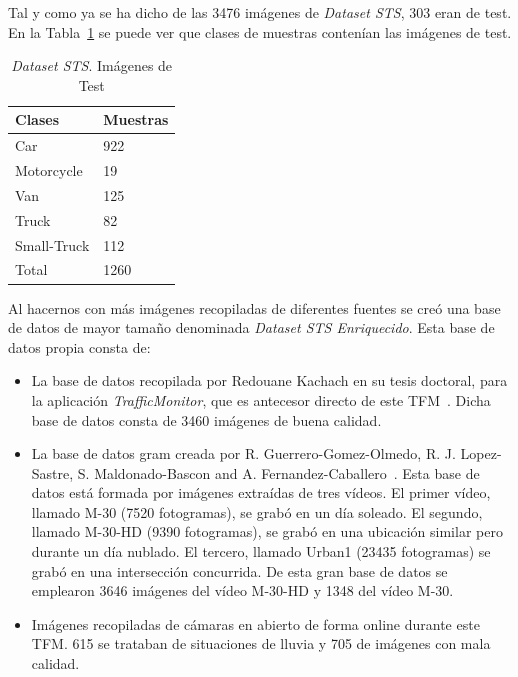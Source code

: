 Tal y como ya se ha dicho de las 3476 imágenes de \textit{Dataset STS}, 303 eran de test. En la Tabla~\ref{tabla_datos_primera_evaluacion} se puede ver que clases de muestras contenían las imágenes de test.

\begin{table}[H]
\begin{center}
\begin{tabular}{|l|l|}
\hline
Clases & Muestras \\
\hline \hline
Car & 922 \\ \hline
Motorcycle & 19 \\ \hline
Van & 125 \\ \hline
Truck & 82 \\ \hline
Small-Truck & 112 \\ \hline
Total & 1260 \\ \hline
\end{tabular}
\caption{\textit{Dataset STS}. Imágenes de Test}
\label{tabla_datos_primera_evaluacion}
\end{center}
\end{table}

Al hacernos con más imágenes recopiladas de diferentes fuentes se creó una base de datos de mayor tamaño denominada \textit{Dataset STS Enriquecido}. Esta base de datos propia consta de:
\begin{itemize}
    \item La base de datos recopilada por Redouane Kachach en su tesis doctoral, para la aplicación \textit{TrafficMonitor}, que es antecesor directo de este TFM~\cite{traffic_monitor_lab}. Dicha base de datos consta de 3460 imágenes de buena calidad.
    \item La base de datos \acrfull{gram} creada por R. Guerrero-Gomez-Olmedo, R. J. Lopez-Sastre, S. Maldonado-Bascon and A. Fernandez-Caballero~\cite{guerrero2013iwinac}. Esta base de datos está formada por imágenes extraídas de tres vídeos. El primer vídeo, llamado M-30 (7520 fotogramas), se grabó en un día soleado. El segundo, llamado M-30-HD (9390 fotogramas), se grabó en una ubicación similar pero durante un día nublado. El tercero, llamado Urban1 (23435 fotogramas) se grabó en una intersección concurrida. De esta gran base de datos se emplearon 3646 imágenes del vídeo M-30-HD y 1348 del vídeo M-30.
    \item Imágenes recopiladas de cámaras en abierto de forma online durante este TFM. 615 se trataban de situaciones de lluvia y 705 de imágenes con mala calidad.
\end{itemize} 

